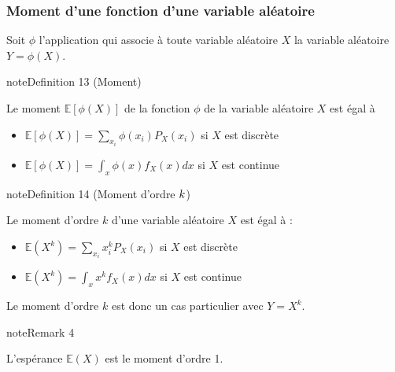 \documentclass[letterpaper,10pt,french]{sphinxmanual}
\begin{document}
\subsubsection{Moment d’une fonction d’une variable aléatoire}
\label{\detokenize{Rappels:moment-d-une-fonction-d-une-variable-aleatoire}}
\ignorespaces 
\sphinxAtStartPar
Soit \(\phi\) l’application qui associe à toute variable aléatoire \(X\) la variable aléatoire \(Y=\phi(X)\).
\label{Rappels:definition-28}
\begin{sphinxadmonition}{note}{Definition 13 (Moment)}



\sphinxAtStartPar
Le moment  \(\mathbb{E}[\phi(X)]\) de la fonction \(\phi\) de la variable aléatoire \(X\) est égal à
\begin{itemize}
\item {} 
\sphinxAtStartPar
\(\mathbb{E}[\phi(X)] = \displaystyle\sum_{x_i} \phi(x_i)P_X(x_i)\) si \(X\) est discrète

\item {} 
\sphinxAtStartPar
\(\mathbb{E}[\phi(X)] = \int_x \phi(x) f_X(x)dx\) si \(X\) est continue

\end{itemize}
\end{sphinxadmonition}

\ignorespaces \label{Rappels:definition-29}
\begin{sphinxadmonition}{note}{Definition 14 (Moment d’ordre \protect\(k\protect\))}



\sphinxAtStartPar
Le moment d’ordre \(k\) d’une variable aléatoire \(X\) est égal à :
\begin{itemize}
\item {} 
\sphinxAtStartPar
\(\mathbb{E}(X^k) = \displaystyle\sum_{x_i} x_i^k P_X(x_i)\) si \(X\) est discrète

\item {} 
\sphinxAtStartPar
\( \mathbb{E}(X^k) = \int_x x^k f_X(x)dx\) si \(X\) est continue

\end{itemize}
\end{sphinxadmonition}

\sphinxAtStartPar
Le moment d’ordre \(k\) est donc un cas particulier avec \(Y=X^k\).
\label{Rappels:remark-30}
\begin{sphinxadmonition}{note}{Remark 4}



\sphinxAtStartPar
L’espérance \(\mathbb{E}(X)\) est le moment d’ordre 1.
\end{sphinxadmonition}
\end{document}
